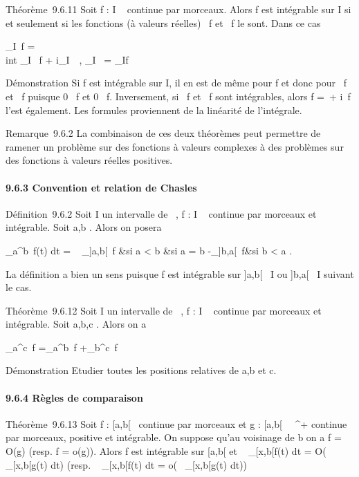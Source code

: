\documentclass[]{article}
\begin{document}
Théorème~9.6.11 Soit f : I \rightarrow~  continue par morceaux. Alors f est
intégrable sur I si et seulement si les fonctions (à valeurs réelles)
\mathrmRe~f et
\mathrmIm~f le sont. Dans ce
cas

\int  _I~f =\\int
 _I \mathrmRe~f +
i\int  _I~\
\mathrmImf,\quad
\int  _I\overlinef~ =
\overline\int  _If~

Démonstration Si f est intégrable sur I, il en est de même pour
f et donc pour
\mathrmRe~f et
\mathrmIm~f puisque 0
\leq\mathrmRe~f\leqf
et 0
\leq\mathrmIm~f\leqf.
Inversement, si \mathrmRe~f
et \mathrmIm~f sont
intégrables, alors f =\
\mathrmRef +
i\mathrmIm~f l'est
également. Les formules proviennent de la linéarité de l'intégrale.

Remarque~9.6.2 La combinaison de ces deux théorèmes peut permettre de
ramener un problème sur des fonctions à valeurs complexes à des
problèmes sur des fonctions à valeurs réelles positives.

\paragraph{9.6.3 Convention et relation de Chasles}

Définition~9.6.2 Soit I un intervalle de ~, f : I \rightarrow~  continue par
morceaux et intégrable. Soit a,b \in\overlineI. Alors
on posera

\int  _a^b~f(t) dt =
\left \ \cases
\int  _]a,b[~f &si a < b
 &si a = b \cr
-\int  _]b,a[~f&si b < a
 \right .

La définition a bien un sens puisque f est intégrable sur ]a,b[\subset~ I
ou ]b,a[\subset~ I suivant le cas.

Théorème~9.6.12 Soit I un intervalle de ~, f : I \rightarrow~  continue par
morceaux et intégrable. Soit a,b,c \in\overlineI. Alors
on a

\int  _a^c~f
=\int  _a^b~f
+\int  _b^c~f

Démonstration Etudier toutes les positions relatives de a,b et c.

\paragraph{9.6.4 Règles de comparaison}

Théorème~9.6.13 Soit f : [a,b[\rightarrow~  continue par morceaux et g :
[a,b[\rightarrow~ ~^+ continue par morceaux, positive et intégrable.
On suppose qu'au voisinage de b on a f = O(g) (resp. f = o(g)). Alors f
est intégrable sur [a,b[ et \int ~
_[x,b[f(t) dt = O(\int ~
_[x,b[g(t) dt) (resp. \int ~
_[x,b[f(t) dt = o(\int ~
_[x,b[g(t) dt))
\end{document}
